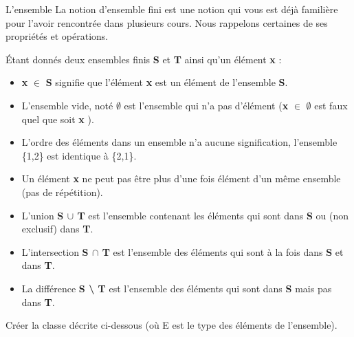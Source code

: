 \begin{Exercice}{L'ensemble}
	La notion d’ensemble fini est une notion qui vous est déjà 
	familière pour l’avoir rencontrée dans plusieurs cours. Nous rappelons
	certaines de ses propriétés et opérations. 
			
	Étant donnés deux ensembles
	finis \textbf{S} et \textbf{T} ainsi qu’un élément \textbf{x} :
	\begin{itemize}
	\item 
		\textbf{x} {${\in}$} \textbf{S} signifie que l’élément \textbf{x}
		est un élément de l’ensemble \textbf{S}.
	\item 
		L’ensemble vide, noté \textbf{${\emptyset}$} 
		est l’ensemble qui n’a pas d’élément 
		(\textbf{x} {${\in}$} \textbf{${\emptyset}$} 
		est faux quel que soit \textbf{x} ).
	\item 
		L’ordre des éléments dans un ensemble n’a
		aucune signification, l’ensemble \{1,2\} est
		identique à \{2,1\}.
	\item 
		Un élément \textbf{x} ne peut
		pas être plus d’une fois élément d’un même ensemble 
		(pas de répétition).
	\item 
		L’union \textbf{S ${\cup}$ T} 
		est l’ensemble contenant les éléments qui sont dans 
		\textbf{S} ou (non exclusif) dans \textbf{T}.
	\item 
		L’intersection \textbf{S ${\cap}$ T} 
		est l’ensemble des éléments qui sont à la fois 
		dans \textbf{S} et dans \textbf{T}.
	\item 
		La différence \textbf{S {\textbackslash} T} 
		est l’ensemble des éléments qui sont 
		dans \textbf{S} mais pas dans \textbf{T}.
	\end{itemize}
	
	Créer la classe 
	décrite ci-dessous
	(où E est le type des éléments de l'ensemble).
	

\end{Exercice}
